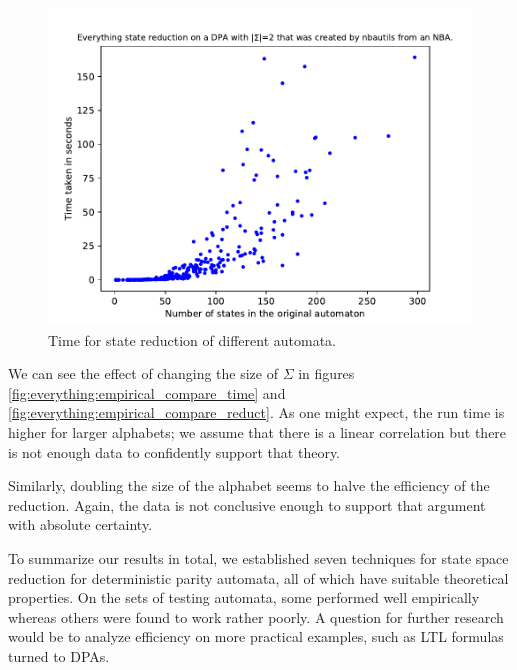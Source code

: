 \begin{figure}
\begin{minipage}{0.49\textwidth}
		\includegraphics[page=1,height=.3\textheight]{../data/analysis/everything/detnbaut_ap1.pdf} 
		\caption{Time for state reduction of different automata.}
		\label{fig:everything:empirical_time}
	\end{minipage}
\end{figure}


We can see the effect of changing the size of $\Sigma$ in figures \ref{fig:everything:empirical_compare_time} and \ref{fig:everything:empirical_compare_reduct}. As one might expect, the run time is higher for larger alphabets; we assume that there is a linear correlation but there is not enough data to confidently support that theory.

Similarly, doubling the size of the alphabet seems to halve the efficiency of the reduction. Again, the data is not conclusive enough to support that argument with absolute certainty.

\vspace{10pt}

To summarize our results in total, we established seven techniques for state space reduction for deterministic parity automata, all of which have suitable theoretical properties. On the sets of testing automata, some performed well empirically whereas others were found to work rather poorly. A question for further research would be to analyze efficiency on more practical examples, such as LTL formulas turned to DPAs.




